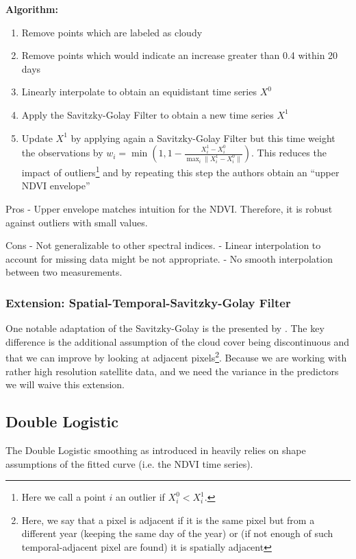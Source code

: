 \textbf{Algorithm:}
\begin{enumerate}
    \item Remove points which are labeled as cloudy
    \item Remove points which would indicate an increase greater than 0.4 within 20 days
    \item Linearly interpolate to obtain an equidistant time series $X^0$
    \item Apply the Savitzky-Golay Filter to obtain a new time series $X^1$
    \item Update $X^1$ by applying again a Savitzky-Golay Filter but this time weight the observations by $w_i = \min\left(1, 1 - \frac{X^1_i-X^0_i}{\max_i\|X^1_i-X^0_i\|}\right)$. This reduces the impact of outliers\footnote{Here we call a point $i$ an outlier if $X^0_i<X^1_i$.} and by repeating this step the authors obtain an ``upper NDVI envelope''
\end{enumerate}

Pros
- Upper envelope matches intuition for the NDVI. Therefore, it is robust against outliers with small values.

Cons
- Not generalizable to other spectral indices.
- Linear interpolation to account for missing data might be not appropriate.
- No smooth interpolation between two measurements.

\subsubsection*{Extension: Spatial-Temporal-Savitzky-Golay Filter}
One notable adaptation of the Savitzky-Golay is the presented by \cite{caoSimpleMethodImprove2018b}. The key difference is the additional assumption of the cloud cover being discontinuous and that we can improve by looking at adjacent pixels\footnote{Here, we say that a pixel is adjacent if it is the same pixel but from a different year (keeping the same day of the year) or (if not enough of such temporal-adjacent pixel are found) it is spatially adjacent}. Because we are working with rather high resolution satellite data, and we need the variance in the predictors we will waive this extension.

\subsection{Double Logistic}
\label{sec:double_logistic}
The Double Logistic smoothing as introduced in \cite{beckImprovedMonitoringVegetation2006} heavily relies on shape assumptions of the fitted curve (i.e. the NDVI time series).

